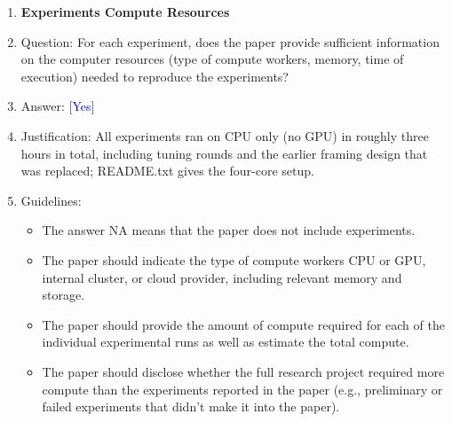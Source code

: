\documentclass[10pt,letterpaper]{article}
\newcommand{\answerYes}[1][]{\textcolor{blue}{[Yes] #1}}
\begin{document}
\begin{enumerate}
\begin{itemize}
        \item It should be clear whether the error bar is the standard deviation or the standard error of the mean.
        \item It is OK to report 1-sigma error bars, but one should state it. The authors should preferably report a 2-sigma error bar than state that they have a 96\% CI, if the hypothesis of Normality of errors is not verified.
        \item For asymmetric distributions, the authors should be careful not to show in tables or figures symmetric error bars that would yield results that are out of range (e.g. negative error rates).
        \item If error bars are reported in tables or plots, The authors should explain in the text how they were calculated and reference the corresponding figures or tables in the text.
    \end{itemize}

\item {\bf Experiments Compute Resources}
    \item[] Question: For each experiment, does the paper provide sufficient information on the computer resources (type of compute workers, memory, time of execution) needed to reproduce the experiments?
    \item[] Answer: \answerYes{}
    \item[] Justification: All experiments ran on CPU only (no GPU) in roughly three hours in total, including tuning rounds and the earlier framing design that was replaced; README.txt gives the four-core setup.
    \item[] Guidelines:
    \begin{itemize}
        \item The answer NA means that the paper does not include experiments.
        \item The paper should indicate the type of compute workers CPU or GPU, internal cluster, or cloud provider, including relevant memory and storage.
        \item The paper should provide the amount of compute required for each of the individual experimental runs as well as estimate the total compute. 
        \item The paper should disclose whether the full research project required more compute than the experiments reported in the paper (e.g., preliminary or failed experiments that didn't make it into the paper). 
    \end{itemize}
    

\end{enumerate}
\end{document}
